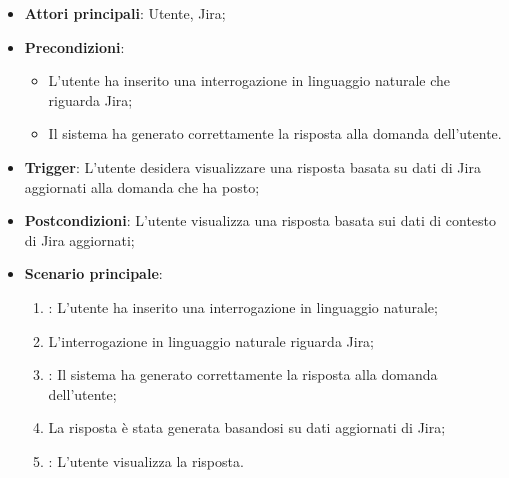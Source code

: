 \hypertarget{UC11.2}{}

\begin{itemize}
    \item \textbf{Attori principali}: Utente, Jira;
    \item \textbf{Precondizioni}: 
    \begin{itemize}
        \item L'utente ha inserito una interrogazione in linguaggio naturale che riguarda Jira;
        \item Il sistema ha generato correttamente la risposta alla domanda dell'utente.
    \end{itemize}
    \item \textbf{Trigger}: L'utente desidera visualizzare una risposta basata su dati di Jira aggiornati alla domanda che ha posto;
    \item \textbf{Postcondizioni}: L'utente visualizza una risposta basata sui dati di contesto di Jira aggiornati;
    \item \textbf{Scenario principale}: 
    \begin{enumerate}
        \item {}: L'utente ha inserito una interrogazione in linguaggio naturale;
        \item L'interrogazione in linguaggio naturale riguarda Jira;
        \item {}: Il sistema ha generato correttamente la risposta alla domanda dell'utente;
        \item La risposta è stata generata basandosi su dati aggiornati di Jira;
        \item {}: L'utente visualizza la risposta.
    \end{enumerate}
\end{itemize}



\hypertarget{UC11.3}{}

